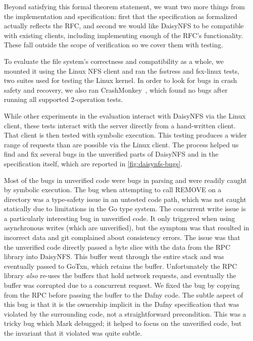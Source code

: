 Beyond satisfying this formal theorem statement, we want two more things from
the implementation and specification: first that the specification as formalized
actually reflects the RFC, and second we would like DaisyNFS to be compatible
with existing clients, including implementing enough of the RFC's functionality.
These fall outside the scope of verification so we cover them with testing.

To evaluate the file system's correctness and compatibility as a whole, we
mounted it using the Linux NFS client and ran the fsstress and fsx-linux tests,
two suites used for testing the Linux kernel. In order to look for bugs in crash
safety and recovery, we also ran CrashMonkey~\cite{mohan:crashmonkey}, which
found no bugs after running all supported 2-operation tests.

While other experiments in the evaluation interact with DaisyNFS via the Linux
client, these tests interact with the server directly from a hand-written
client. That client is then tested with symbolic execution.
This testing produces a wider range of requests than are possible via the Linux
client. The process helped us find and fix several bugs in the unverified parts
of DaisyNFS and in the specification itself, which are reported in
\cref{fig:daisynfs-bugs}.

Most of the bugs in unverified code were bugs in parsing and were readily caught
by symbolic execution. The bug when attempting to call REMOVE on a directory was
a type-safety issue in an untested code path, which was not caught statically
due to limitations in the Go type system. The concurrent write issue is
a particularly interesting bug in unverified code. It only triggered when using
asynchronous writes (which are unverified), but the symptom was that  resulted in incorrect data and git complained about consistency errors.
The issue was that the unverified code directly passed a byte slice with the
 data from the RPC library into DaisyNFS. This buffer went through the
entire stack and was eventually passed to GoTxn, which retains the buffer.
Unfortunately the RPC library \emph{also} re-uses the buffers that hold network
requests, and eventually the buffer was corrupted due to a concurrent request.
We fixed the bug by copying from the RPC before passing the buffer to the Dafny
code. The subtle aspect of this bug is that it is the ownership implicit in the
Dafny specification that was violated by the surrounding code, not a
straightforward precondition.  This was a tricky bug which Mark debugged; it
helped to focus on the unverified code, but the invariant that it violated was
quite subtle.

